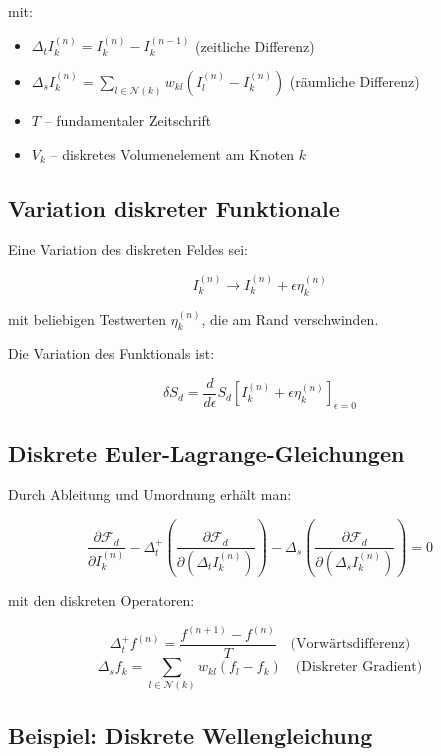 mit:

\begin{itemize}
    \item \( \Delta_t I_k^{(n)} = I_k^{(n)} - I_k^{(n-1)} \) (zeitliche Differenz)
    \item \( \Delta_s I_k^{(n)} = \sum_{l \in \mathcal{N}(k)} w_{kl} (I_l^{(n)} - I_k^{(n)}) \) (räumliche Differenz)
    \item \( T \) – fundamentaler Zeitschrift
    \item \( V_k \) – diskretes Volumenelement am Knoten \( k \)
\end{itemize}

\subsection{Variation diskreter Funktionale}
\label{sub:mathematik_variation}

Eine Variation des diskreten Feldes sei:

\[
I_k^{(n)} \to I_k^{(n)} + \epsilon \eta_k^{(n)}
\]

mit beliebigen Testwerten \( \eta_k^{(n)} \), die am Rand verschwinden.

Die Variation des Funktionals ist:

\[
\delta S_d = \frac{d}{d\epsilon} S_d \left[ I_k^{(n)} + \epsilon \eta_k^{(n)} \right]_{\epsilon=0}
\]

\subsection{Diskrete Euler-Lagrange-Gleichungen}
\label{sub:mathematik_euler_lagrange}

Durch Ableitung und Umordnung erhält man:

\[
\frac{\partial \mathcal{F}_d}{\partial I_k^{(n)}} - \Delta_t^+ \left( \frac{\partial \mathcal{F}_d}{\partial (\Delta_t I_k^{(n)})} \right) - \Delta_s \left( \frac{\partial \mathcal{F}_d}{\partial (\Delta_s I_k^{(n)})} \right) = 0
\]

mit den diskreten Operatoren:

\[
\Delta_t^+ f^{(n)} = \frac{f^{(n+1)} - f^{(n)}}{T} \quad \text{(Vorwärtsdifferenz)}
\]
\[
\Delta_s f_k = \sum_{l \in \mathcal{N}(k)} w_{kl} (f_l - f_k) \quad \text{(Diskreter Gradient)}
\]

\subsection{Beispiel: Diskrete Wellengleichung}
\label{sub:mathematik_wellengleichung}


